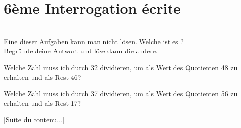 \documentclass[10pt,openany]{book}
\begin{document}
\pagestyle{empty}
\section*{6\`eme Interrogation \'ecrite}

\\
Eine dieser Aufgaben kann man nicht l\"osen. Welche ist es ?\\ Begr\"unde deine Antwort und l\"ose dann die andere.
\begin{multicols}{2}
Welche Zahl muss ich durch 32 dividieren, um als Wert des Quotienten 48 zu erhalten und als Rest 46?

\columnbreak
Welche Zahl muss ich durch 37 dividieren, um als Wert des Quotienten 56 zu erhalten und als Rest 17?
\end{multicols}

[Suite du contenu...]
\end{document}
